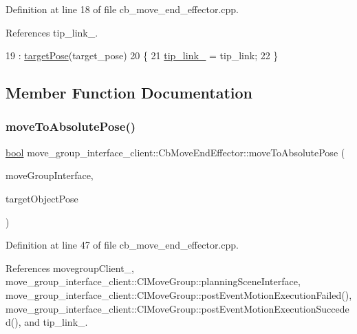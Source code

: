 Definition at line 18 of file cb\+\_\+move\+\_\+end\+\_\+effector.\+cpp.



References tip\+\_\+link\+\_\+.


\begin{DoxyCode}
19   : \hyperlink{classmove__group__interface__client_1_1CbMoveEndEffector_a645e7131ef58ab052efbadf53ea82c59}{targetPose}(target\_pose)
20 \{
21   \hyperlink{classmove__group__interface__client_1_1CbMoveEndEffector_a26d35b0beeb0476a62a46b9b9d659251}{tip\_link\_} = tip\_link;
22 \}
\end{DoxyCode}


\subsection{Member Function Documentation}
\mbox{\label{classmove__group__interface__client_1_1CbMoveEndEffector_a7850f5f9c6fbc040b77e8456a2ecee09}} 
\subsubsection{\texorpdfstring{move\+To\+Absolute\+Pose()}{moveToAbsolutePose()}}
{\footnotesize\ttfamily \hyperlink{classbool}{bool} move\+\_\+group\+\_\+interface\+\_\+client\+::\+Cb\+Move\+End\+Effector\+::move\+To\+Absolute\+Pose (\begin{DoxyParamCaption}\item[{moveit\+::planning\+\_\+interface\+::\+Move\+Group\+Interface \&}]{move\+Group\+Interface,  }\item[{geometry\+\_\+msgs\+::\+Pose\+Stamped \&}]{target\+Object\+Pose }\end{DoxyParamCaption})\hspace{0.3cm}{\ttfamily [protected]}}



Definition at line 47 of file cb\+\_\+move\+\_\+end\+\_\+effector.\+cpp.



References movegroup\+Client\+\_\+, move\+\_\+group\+\_\+interface\+\_\+client\+::\+Cl\+Move\+Group\+::planning\+Scene\+Interface, move\+\_\+group\+\_\+interface\+\_\+client\+::\+Cl\+Move\+Group\+::post\+Event\+Motion\+Execution\+Failed(), move\+\_\+group\+\_\+interface\+\_\+client\+::\+Cl\+Move\+Group\+::post\+Event\+Motion\+Execution\+Succeded(), and tip\+\_\+link\+\_\+.



